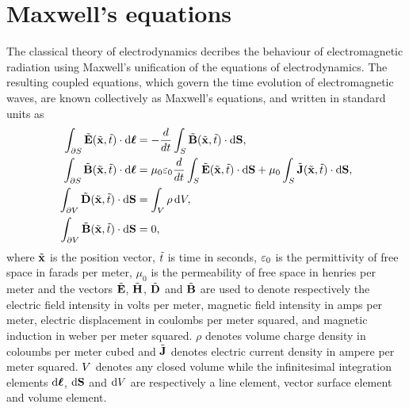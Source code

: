 \section{Maxwell's equations}
The classical theory of electrodynamics decribes the behaviour of
electromagnetic radiation using Maxwell's unification of the equations of
electrodynamics\cite{Balanis:ui,Jackson:490457}. The resulting coupled
equations, which govern the time evolution of electromagnetic waves, are known
collectively as Maxwell's equations, and written in standard units as
\begin{subequations}
  \begin{align}
    \int_{\partial S} \tilde{\mathbf{E}}(\tilde{\mathbf{x}},\tilde{t}) \cdot \mathrm{d}\boldsymbol{\ell}  &= - \frac{d}{dt} \int_{S} \tilde{\mathbf{B}}(\tilde{\mathbf{x}},\tilde{t}) \cdot \mathrm{d}\mathbf{S}, \label{eq:maxwell-faraday-integral} \\
    \int_{\partial S} \tilde{\mathbf{B}}(\tilde{\mathbf{x}},\tilde{t}) \cdot \mathrm{d}\boldsymbol{\ell} &= \mu_0 \varepsilon_0 \frac{d}{dt} \int_{S} \tilde{\mathbf{E}}(\tilde{\mathbf{x}},\tilde{t}) \cdot \mathrm{d}\mathbf{S} +  \mu_0 \int_{S} \tilde{\mathbf{J}}(\tilde{\mathbf{x}},\tilde{t}) \cdot \mathrm{d}\mathbf{S}, \label{eq:maxwell-ampere-integral} \\
    \int_{\partial V} \tilde{\mathbf{D}}(\tilde{\mathbf{x}},\tilde{t})\cdot\mathrm{d}\mathbf{S} &= \int_V \rho \,\mathrm{d}V, \label{eq:maxwell-gauss-integral} \\
    \int_{\partial V} \tilde{\mathbf{B}}(\tilde{\mathbf{x}},\tilde{t})\cdot\mathrm{d}\mathbf{S} &= 0, \label{eq:maxwell-gauss-magnetism-integral}
  \end{align}
\end{subequations}
where $\tilde{\mathbf{x}}$ is the position vector, $\tilde{t}$ is time in seconds, $\varepsilon_0$
is the permittivity of free space in farads per meter, $\mu_0$ is the
permeability of free space in henries per meter and the vectors $\tilde{\mathbf{E}}$,
$\tilde{\mathbf{H}}$, $\tilde{\mathbf{D}}$ and $\tilde{\mathbf{B}}$ are used to denote respectively the electric
field intensity in volts per meter, magnetic field intensity in amps per meter,
electric displacement in coulombs per meter squared, and magnetic induction in
weber per meter squared. $\rho$ denotes volume charge density in coloumbs per
meter cubed and $\tilde{\mathbf{J}}$ denotes electric current density in ampere per meter
squared.
$V$ denotes any closed volume while the infinitesimal integration elements
$\mathrm{d}\boldsymbol{\ell}$, $\mathrm{d}\mathbf{S}$ and $\mathrm{d}V$ are respectively a line element, vector surface
element and volume element.
